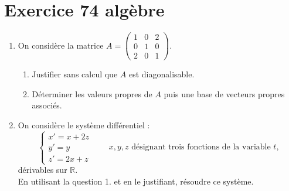 \documentclass[a4paper,12pt,oneside]{book}
\newenvironment{statement}{\begin{statementbox}}{\end{statementbox}}
\begin{document}
	\section*{Exercice 74 \quad algèbre}
	\begin{statement}
		\begin{enumerate}
			\item On considère la matrice \( A = \begin{pmatrix} 1 & 0 & 2 \\ 0 & 1 & 0 \\ 2 & 0 & 1 \end{pmatrix} \).
			\begin{enumerate}
				\item Justifier sans calcul que \( A \) est diagonalisable.
				\item Déterminer les valeurs propres de \( A \) puis une base de vecteurs propres associés.
			\end{enumerate}
			\item On considère le système différentiel :
			\[
			\begin{cases}
				x' = x + 2z \\
				y' = y \\
				z' = 2x + z
			\end{cases}
			\qquad x, y, z \text{ désignant trois fonctions de la variable } t,
			\]
			dérivables sur \( \mathbb{R} \).\\
			En utilisant la question 1. et en le justifiant, résoudre ce système.
		\end{enumerate}
	\end{statement}
\end{document}

